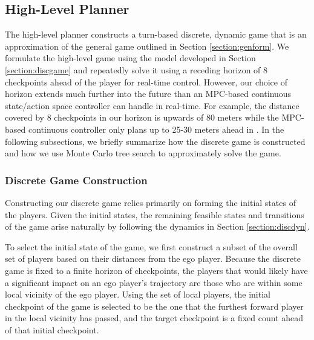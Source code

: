 \subsection{High-Level Planner}
The high-level planner constructs a turn-based discrete, dynamic game that is an approximation of the general game outlined in Section \ref{section:genform}. We formulate the high-level game using the model developed in Section \ref{section:discgame} and repeatedly solve it using a receding horizon of 8 checkpoints ahead of the player for real-time control. However, our choice of horizon extends much further into the future than an MPC-based continuous state/action space controller can handle in real-time. For example, the distance covered by 8 checkpoints in our horizon is upwards of 80 meters while the MPC-based continuous controller only plans up to 25-30 meters ahead in \cite{Wang2019, Wang2021}. In the following subsections, we briefly summarize how the discrete game is constructed and how we use Monte Carlo tree search to approximately solve the game.

\subsubsection{Discrete Game Construction}
Constructing our discrete game relies primarily on forming the initial states of the players. Given the initial states, the remaining feasible states and transitions of the game arise naturally by following the dynamics in Section \ref{section:discdyn}. 

To select the initial state of the game, we first construct a subset of the overall set of players based on their distances from the ego player. Because the discrete game is fixed to a finite horizon of checkpoints, the players that would likely have a significant impact on an ego player's trajectory are those who are within some local vicinity of the ego player. Using the set of local players, the initial checkpoint of the game is selected to be the one that the furthest forward player in the local vicinity has passed, and the target checkpoint is a fixed count ahead of that initial checkpoint. 

